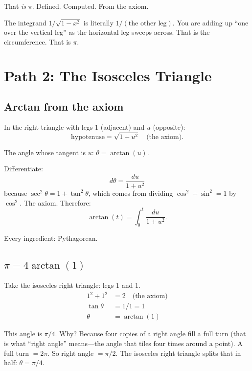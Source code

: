 \documentclass[11pt,a4paper]{article}
\theoremstyle{plain}
\theoremstyle{definition}
\begin{document}
That \emph{is} $\pi$. Defined. Computed. From the axiom.

The integrand $1/\sqrt{1-x^2}$ is literally $1/(\text{the other leg})$.
You are adding up ``one over the vertical leg'' as the horizontal leg
sweeps across. That is the circumference. That is $\pi$.

\section{Path 2: The Isosceles Triangle}

\subsection{Arctan from the axiom}

In the right triangle with legs $1$ (adjacent) and $u$ (opposite):
\begin{equation}
  \text{hypotenuse} = \sqrt{1 + u^2} \quad \text{(the axiom)}.
\end{equation}

The angle whose tangent is $u$: $\theta = \arctan(u)$.

Differentiate:
\begin{equation}
  d\theta = \frac{du}{1 + u^2}
\end{equation}
because $\sec^2\theta = 1 + \tan^2\theta$, which comes from dividing
$\cos^2 + \sin^2 = 1$ by $\cos^2$. The axiom. Therefore:
\begin{equation}\label{eq:arctan}
  \arctan(t) = \int_0^t \frac{du}{1 + u^2}.
\end{equation}

Every ingredient: Pythagorean.

\subsection{$\pi = 4\arctan(1)$}

Take the isosceles right triangle: legs $1$ and $1$.
\begin{align}
  1^2 + 1^2 &= 2 \quad \text{(the axiom)} \\
  \tan\theta &= 1/1 = 1 \\
  \theta &= \arctan(1)
\end{align}

This angle is $\pi/4$. Why? Because four copies of a right angle fill a
full turn (that is what ``right angle'' means---the angle that tiles four
times around a point). A full turn $= 2\pi$. So right angle $= \pi/2$.
The isosceles right triangle splits that in half: $\theta = \pi/4$.
\end{document}
